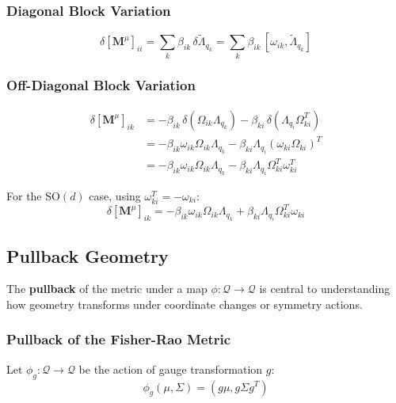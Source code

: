 \documentclass[12pt]{article}
\begin{document}
\subsubsection{Diagonal Block Variation}

\begin{equation}
\delta[\mathbf{M}^\mu]_{ii} = \sum_k \beta_{ik} \, \delta\tilde{\Lambda}_{q_k} = \sum_k \beta_{ik} \, [\omega_{ik}, \tilde{\Lambda}_{q_k}]
\end{equation}

\subsubsection{Off-Diagonal Block Variation}

\begin{align}
\delta[\mathbf{M}^\mu]_{ik} &= -\beta_{ik} \, \delta(\Omega_{ik}\Lambda_{q_k}) - \beta_{ki} \, \delta(\Lambda_{q_i}\Omega_{ki}^T) \nonumber\\
&= -\beta_{ik}\omega_{ik}\Omega_{ik}\Lambda_{q_k} - \beta_{ki}\Lambda_{q_i}(\omega_{ki}\Omega_{ki})^T \nonumber\\
&= -\beta_{ik}\omega_{ik}\Omega_{ik}\Lambda_{q_k} - \beta_{ki}\Lambda_{q_i}\Omega_{ki}^T\omega_{ki}^T
\end{align}

For the $\mathrm{SO}(d)$ case, using $\omega_{ki}^T = -\omega_{ki}$:
\begin{equation}
\boxed{\delta[\mathbf{M}^\mu]_{ik} = -\beta_{ik}\omega_{ik}\Omega_{ik}\Lambda_{q_k} + \beta_{ki}\Lambda_{q_i}\Omega_{ki}^T\omega_{ki}}
\end{equation}

\subsection{Pullback Geometry}

The \textbf{pullback} of the metric under a map $\phi: \mathcal{Q} \to \mathcal{Q}$ is central to understanding how geometry transforms under coordinate changes or symmetry actions.

\subsubsection{Pullback of the Fisher-Rao Metric}

Let $\phi_g: \mathcal{Q} \to \mathcal{Q}$ be the action of gauge transformation $g$:
\begin{equation}
\phi_g(\mu, \Sigma) = (g\mu, g\Sigma g^T)
\end{equation}
\end{document}
